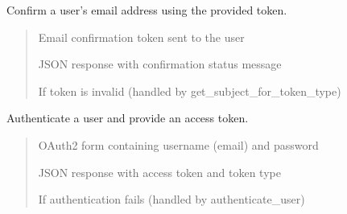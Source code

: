 \documentclass[letterpaper,10pt,openany,oneside,english]{sphinxmanual}
\begin{document}
\begin{savenotes}\begin{fulllineitems}
\label{\detokenize{modules/routers:storeapi.routers.user.confirm_email}}
\pysigstartsignatures
{}
\pysigstopsignatures
\sphinxAtStartPar
Confirm a user’s email address using the provided token.
\begin{quote}\begin{description}
\sphinxAtStartPar
{} \textendash{} Email confirmation token sent to the user

\sphinxAtStartPar
JSON response with confirmation status message

\sphinxAtStartPar
{} \textendash{} If token is invalid (handled by get\_subject\_for\_token\_type)

\end{description}\end{quote}

\end{fulllineitems}\end{savenotes}


\begin{savenotes}\begin{fulllineitems}
\label{\detokenize{modules/routers:storeapi.routers.user.login}}
\pysigstartsignatures
{}
\pysigstopsignatures
\sphinxAtStartPar
Authenticate a user and provide an access token.
\begin{quote}\begin{description}
\sphinxAtStartPar
{} \textendash{} OAuth2 form containing username (email) and password

\sphinxAtStartPar
JSON response with access token and token type

\sphinxAtStartPar
{} \textendash{} If authentication fails (handled by authenticate\_user)

\end{description}\end{quote}

\end{fulllineitems}\end{savenotes}
\end{document}
